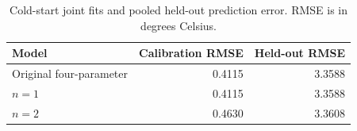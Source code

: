 \begin{table}[htbp]
\centering
\small
\caption{Cold-start joint fits and pooled held-out prediction error. RMSE is in degrees Celsius.}
\label{tab:teaching-prediction}
\begin{tabular}{lrr}
\toprule
Model & Calibration RMSE & Held-out RMSE \\
\midrule
Original four-parameter & 0.4115 & 3.3588 \\
$n=1$ & 0.4115 & 3.3588 \\
$n=2$ & 0.4630 & 3.3608 \\
\bottomrule
\end{tabular}
\end{table}
